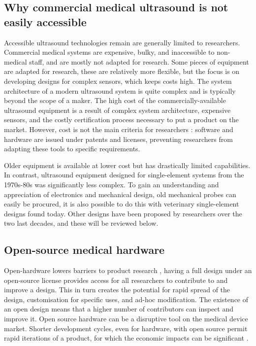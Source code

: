 \documentclass{article}
\begin{document}
\subsection{Why commercial medical ultrasound is not easily accessible}

Accessible ultrasound technologies remain are generally limited to researchers. Commercial medical systems are expensive, bulky, and inaccessible to non-medical staff, and are mostly not adapted for research. Some pieces of equipment are adapted for research, these are relatively more flexible, but the focus is on developing designs for complex sensors, which keeps costs high. The system architecture of a modern ultrasound system is quite complex and is typically beyond the scope of a maker. The high cost of the commercially-available ultrasound equipment is a result of complex system architecture, expensive sensors, and the costly certification process necessary to put a product on the market. However, cost is not the main criteria for researchers \cite{chagas_haves_2018}: software and hardware are issued under patents and licenses, preventing researchers from adapting these tools to specific requirements.

Older equipment is available at lower cost but has drastically limited capabilities. In contrast, ultrasound equipment designed for single-element systems from the 1970s-80s was significantly less complex. To gain an understanding and appreciation of electronics and mechanical design, old mechanical probes can easily be procured, it is also possible to do this with veterinary single-element designs found today. Other designs have been proposed by researchers over the two last decades, and these will be reviewed below. 

\subsection{Open-source medical hardware}

Open-hardware lowers barriers to product research \cite{pandey_open_2019}, having a full design under an open-source license provides access for all researchers to contribute to and improve a design. This in turn creates the potential for rapid spread of the design, customisation for specific uses, and ad-hoc modification. The existence of an open design means that a higher number of contributors can inspect and improve it. Open source hardware can be a disruptive tool on the medical device market. Shorter development cycles, even for hardware, with open source permit rapid iterations of a product, for which the economic impacts can be significant \cite{pearce_quantifying_2015, pearce_return_2016, moritz_economic_2019, winter_open_2019}.
\end{document}
